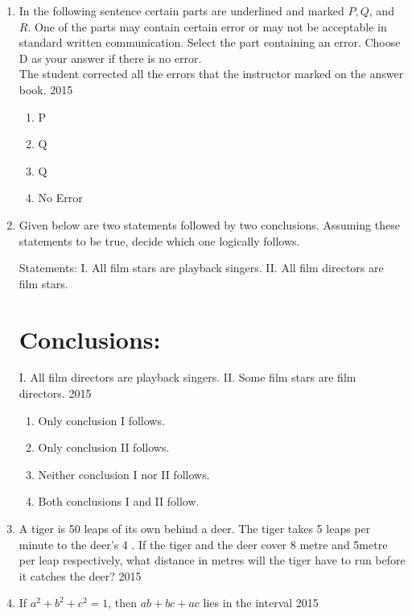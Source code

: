 \documentclass[journal]{IEEEtran}
\begin{document}
\begin{enumerate}
\item In the following sentence certain parts are underlined and marked $P, Q$, and $R$. One of the parts may contain certain error or may not be acceptable in standard written communication. Select the part containing an error. Choose D as your answer if there is no error.\\
The student corrected all the errors that the instructor marked on the answer book.
\hfill{2015}
   \begin{multicols}{4}
			\begin{enumerate}
   \item P
\item  Q
\item Q
\item  No Error
\end{enumerate}
		\end{multicols}
  \item  Given below are two statements followed by two conclusions. Assuming these statements to be true, decide which one logically follows.
  

Statements:
I. All film stars are playback singers.
II. All film directors are film stars.

\section*{Conclusions:}
I. All film directors are playback singers.
II. Some film stars are film directors.
\hfill{2015}
\begin{enumerate}
    
\item  Only conclusion I follows.
  \item  Only conclusion II follows.
\item  Neither conclusion I nor II follows.
 \item  Both conclusions I and II follow.
\end{enumerate}

  \item   A tiger is 50 leaps of its own behind a deer. The tiger takes 5 leaps per minute to the deer's 4 . If the tiger and the deer cover 8 metre and 5metre per leap respectively, what distance in metres will the tiger have to run before it catches the deer?
  \hfill{2015}
 \item If $a^{2}+b^{2}+c^{2}=1$, then $a b+b c+a c$ lies in the interval
 \hfill{2015}
  \begin{multicols}{4}
      

\end{multicols}
\end{enumerate}
\end{document}

